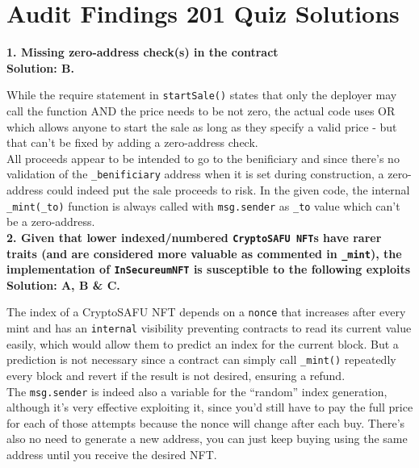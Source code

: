 \section{Audit Findings 201 Quiz Solutions}

\textbf{1. Missing zero-address check(s) in the contract}\label{sec:exam8_q1}\\

\textbf{Solution: B.}

While the require statement in \verb|startSale()| states that only the deployer may call the function AND the price needs to be not zero, the actual code uses OR which allows anyone to start the sale as long as they specify a valid price - but that can't be fixed by adding a zero-address check.\\

All proceeds appear to be intended to go to the benificiary and since there's no validation of the \verb|_benificiary| address when it is set during construction, a zero-address could indeed put the sale proceeds to risk.
In the given code, the internal \verb|_mint(_to)| function is always called with \verb|msg.sender| as \verb|_to| value which can't be a zero-address.\\

\textbf{2. Given that lower indexed/numbered \texttt{CryptoSAFU NFT}s have rarer traits (and are considered more valuable as commented in \texttt{\_mint}), the implementation of \texttt{InSecureumNFT} is susceptible to the following exploits}\label{sec:exam8_q2}\\

\textbf{Solution: A, B \& C.}

The index of a CryptoSAFU NFT depends on a \verb|nonce| that increases after every mint and has an \verb|internal| visibility preventing contracts to read its current value easily, which would allow them to predict an index for the current block. But a prediction is not necessary since a contract can simply call \verb|_mint()| repeatedly every block and revert if the result is not desired, ensuring a refund.\\

The \verb|msg.sender| is indeed also a variable for the ``random'' index generation, although it's very effective exploiting it, since you'd still have to pay the full price for each of those attempts because the nonce will change after each buy.
There's also no need to generate a new address, you can just keep buying using the same address until you receive the desired NFT.\\

